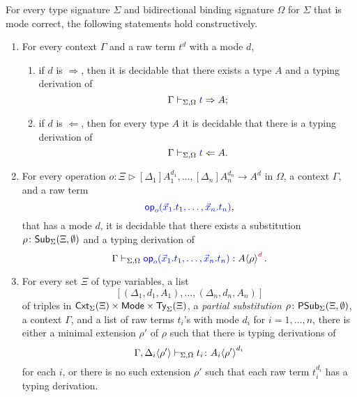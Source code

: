 \documentclass[acmsmall,screen]{acmart}
\theoremstyle{acmdefinition}
\begin{document}
\begin{theorem}
  For every type signature $\Sigma$ and bidirectional binding signature $\Omega$ for $\Sigma$ that is mode correct, the following statements hold constructively.
  \begin{enumerate}
    \item For every context $\Gamma$ and a raw term $t^d$ with a mode $d$, 
      \begin{enumerate}
        \item if $d$ is $\Rightarrow$, then it is decidable that there exists a type $A$ and a typing derivation of
          \[\Gamma \vdash_{\Sigma, \Omega} {\textcolor{blue}{t}} \Rightarrow A;
          \]
        \item if $d$ is $\Leftarrow$, then for every type $A$ it is decidable that there is a typing derivation of
          \[
            \Gamma \vdash_{\Sigma, \Omega} {\textcolor{blue}{t}} \Leftarrow A.
          \]
      \end{enumerate}

    \item For every operation $o \colon \Xi \rhd [\Delta_1]A_{1}^{d_1}, \ldots, [\Delta_{n}] A^{d_n}_{n} \to A^{d}$ in $\Omega$, a context $\Gamma$, and a raw term
      \[
        {\textcolor{blue}{\mathsf{op}_{o}(\vec{x}_1.t_1,\ldots, \vec{x}_n.t_n)}}, 
      \]
      that has a mode $d$, it is decidable that there exists a substitution $\rho\colon \mathsf{Sub}_{\Sigma}(\Xi,\emptyset)$ and a typing derivation of
      \[
        \Gamma \vdash_{\Sigma, \Omega} {\textcolor{blue}{\mathsf{op}_{o}(\vec{x}_1.t_1,\ldots, \vec{x}_n.t_n)}} : {A}\!\left<{\rho}\right>^{\mathrel{\textcolor{purple}{d}}}.
      \]
    \item For every set $\Xi$ of type variables, a list
      \[
        \left[\left(\Delta_1, d_1, A_1\right), \ldots, \left(\Delta_n, d_n, A_n\right)\right]
      \]
      of triples in $\mathsf{Cxt}_{\Sigma}(\Xi) \times \mathsf{Mode} \times \mathsf{Ty}_{\Sigma}(\Xi)$, a \emph{partial substitution} $\rho\colon\mathsf{PSub}_{\Sigma}(\Xi,\emptyset)$, a context $\Gamma$, and a list of raw terms $t_i$'s with mode $d_i$ for $i = 1, \ldots, n$, there is either a minimal extension $\rho'$ of $\rho$ such that there is typing derivations of
      \[
        \Gamma, {\Delta_i}\!\left<{\rho'}\right> \vdash_{\Sigma, \Omega} t_i \colon {A_i}\!\left<{\rho'}\right>^{d_i}
      \]
      for each $i$, or there is no such extension $\rho'$ such that each raw term $t_i^{d_i}$ has a typing derivation. 


\end{enumerate}
\end{theorem}
\end{document}
